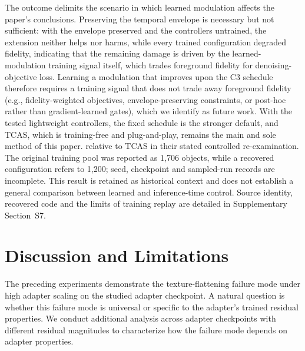 \documentclass[times,twocolumn,final]{elsarticle}
\providecommand{\DIFadd}[1]{{\protect\color{blue} \sf #1}} %
\providecommand{\DIFdel}[1]{{\protect\color{red} \scriptsize #1}} %
\providecommand{\DIFaddbegin}{} %
\providecommand{\DIFaddend}{} %
\providecommand{\DIFdelbegin}{} %
\providecommand{\DIFdelend}{} %
\begin{document}
\DIFdel{The outcome delimits the scenario in which learned modulation affects the paper's conclusions. Preserving the temporal envelope is necessary but not sufficient: with the envelope preserved and the controllers untrained, the extension neither helps nor harms, while every trained configuration degraded fidelity, indicating that the remaining damage is driven by the learned-modulation training signal itself, which trades foreground fidelity for denoising-objective loss. Learning a modulation that improves upon the C3 schedule therefore requires a training signal that does not trade away foreground fidelity (e.g., fidelity-weighted objectives, envelope-preserving constraints, or post-hoc rather than gradient-learned gates), which we identify as future work. With the tested lightweight controllers, the fixed schedule is the stronger default, and TCAS, which is training-free and plug-and-play, remains the main and sole method of this paper.
}\DIFdelend \DIFaddbegin \DIFadd{relative to TCAS in their stated controlled re-examination. The original training pool was reported as 1,706 objects, while a recovered configuration refers to 1,200; seed, checkpoint and sampled-run records are incomplete. This result is retained as historical context and does not establish a general comparison between learned and inference-time control. Source identity, recovered code and the limits of training replay are detailed in Supplementary Section~S7.
}\DIFaddend 


\FloatBarrier
\DIFaddbegin \section{Discussion and Limitations}
\label{sec:limitations}
\DIFaddend 

\DIFdelbegin %

\DIFdel{The preceding experiments demonstrate the texture-flattening failure mode under high adapter scaling on the studied adapter checkpoint. A natural question is whether this failure mode is universal or specific to the adapter's trained residual properties. We conduct additional analysis across adapter checkpoints with different residual magnitudes to characterize how the failure mode depends on adapter properties.
}%
\end{document}
